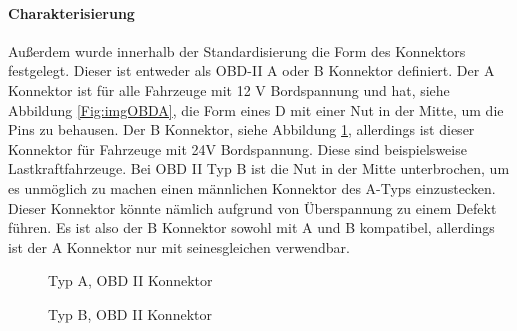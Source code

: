 \paragraph{Charakterisierung}
Außerdem wurde innerhalb der Standardisierung die Form des Konnektors festgelegt. Dieser ist entweder als OBD-II A oder B Konnektor definiert. Der A Konnektor ist für alle Fahrzeuge mit 12 V Bordspannung und hat, siehe Abbildung \ref{Fig:imgOBDA}, die Form eines D mit einer Nut in der Mitte, um die Pins zu behausen. Der B Konnektor, siehe Abbildung \ref{Fig:imgOBDB},  allerdings ist dieser Konnektor für Fahrzeuge mit 24V Bordspannung. Diese sind beispielsweise Lastkraftfahrzeuge. Bei OBD II Typ B ist die Nut in der Mitte unterbrochen, um es unmöglich zu machen einen männlichen Konnektor des A-Typs einzustecken. Dieser Konnektor könnte nämlich aufgrund von Überspannung zu einem Defekt führen. Es ist also der B Konnektor sowohl mit A und B kompatibel, allerdings ist der A Konnektor nur mit seinesgleichen verwendbar.

\begin{figure}[!htb]\centering
   \begin{minipage}{0.49\textwidth}
     \caption{Typ A, OBD II Konnektor \cite{SIMR.CH2-obd2.OBDIITypeA}}\label{Fig:imgOBDA}
   \end{minipage}
   \begin {minipage}{0.49\textwidth}
     \caption{Typ B, OBD II Konnektor \cite{SIMR.CH2-obd2.OBDIITypeB}}\label{Fig:imgOBDB}
   \end{minipage}
\end{figure}


